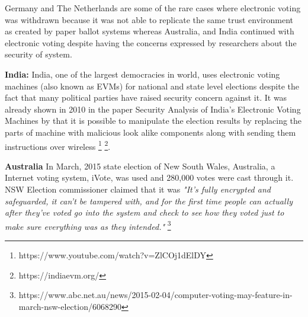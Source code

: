   
  Germany and The Netherlands are some of the rare cases where 
  electronic voting was withdrawn because it was not able to 
  replicate the same trust environment as created by paper 
  ballot systems whereas Australia, and India continued 
  with electronic voting despite having the concerns expressed 
  by researchers about the security of system. 
  
  \textbf{India:}
  India, one of the largest democracies in world, 
  uses electronic voting machines (also known as EVMs) for national 
  and state level  elections despite the fact that many political parties have raised security 
  concern against it. It was already shown in 2010 in the paper 
  Security Analysis of India's Electronic Voting Machines by 
  \cite{Wolchok:2010:SAI:1866307.1866309}  that it 
  is possible to manipulate the election results by replacing the 
  parts of machine with malicious look alike components along with sending 
  them instructions over wireless
  \footnote{https://www.youtube.com/watch?v=ZlCOj1dElDY} 
  \footnote{https://indiaevm.org/}. 
  
%  

 \textbf{Australia}
  In March, 2015 state election 
  of New South Wales, Australia, a Internet voting system, iVote,    
  was used and 280,000 votes were cast through it. NSW Election 
  commissioner claimed that it was 
 \textit{
 "It's fully encrypted and safeguarded, it can't be tampered with, 
 and for the first time people can actually after they've voted 
 go into the system and check to see how they voted just to make 
 sure everything was as they intended." }
 \footnote{https://www.abc.net.au/news/2015-02-04/computer-voting-may-feature-in-march-nsw-election/6068290} 

